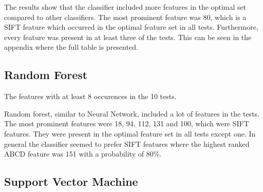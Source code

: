 \documentclass{kththesis}
\begin{document}
The results show that the classifier included more features in the optimal set compared to other classifiers. The most prominent feature was 80, which is a SIFT feature which occurred in the optimal feature set in all tests. Furthermore, every feature was present in at least three of the tests. This can be seen in the appendix where the full table is presented.

\subsection{Random Forest}

\begin{table}[h!]
  \begin{center}
    \caption{The features with at least 8 occurences in the 10 tests.}
  \end{center}
\end{table}

Random forest, similar to Neural Network, included a lot of features in the tests. The most prominent features were 18, 94, 112, 131 and 100, which were SIFT features. They were present in the optimal feature set in all tests except one. In general the classifier seemed to prefer SIFT features where the highest ranked ABCD feature was 151 with a probability of 80\%.

\subsection{Support Vector Machine}
\end{document}
